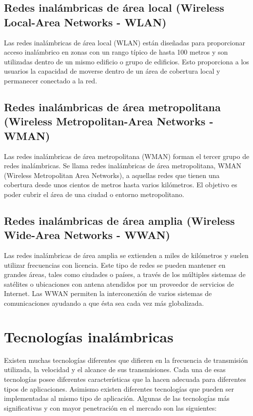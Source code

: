 	\subsection{Redes inalámbricas de área local (Wireless Local-Area Networks - WLAN)}
	Las redes inalámbricas de área local (WLAN) están diseñadas para proporcionar acceso inalámbrico en zonas con un rango típico de hasta 100 metros y son utilizadas dentro de un mismo edificio o grupo de edificios. Esto proporciona a los usuarios la capacidad de moverse dentro de un área de cobertura local y permanecer conectado a la red. 
	
	\subsection{Redes inalámbricas de área metropolitana (Wireless Metropolitan-Area Networks - WMAN)}
	Las redes inalámbricas de área metropolitana (WMAN) forman el tercer grupo de redes inalámbricas. Se llama redes inalámbricas de área metropolitana, WMAN (Wireless Metropolitan Area Networks), a aquellas redes que tienen una cobertura desde unos cientos de metros hasta varios kilómetros. El objetivo es poder cubrir el área de una ciudad o entorno metropolitano. 
	
	\subsection{Redes inalámbricas de área amplia (Wireless Wide-Area Networks - WWAN)}
	Las redes inalámbricas de área amplia se extienden a miles de kilómetros y suelen utilizar frecuencias con licencia. Este tipo de redes se pueden mantener en grandes áreas, tales como ciudades o países, a través de los múltiples sistemas de satélites o ubicaciones con antena atendidos por un proveedor de servicios de Internet. Las WWAN permiten la interconexión de varios sistemas de comunicaciones ayudando a que ésta sea cada vez más globalizada.

	\section{Tecnologías inalámbricas}
	Existen muchas tecnologías diferentes que difieren en la frecuencia de transmisión utilizada, la velocidad y el alcance de sus transmisiones. Cada una de esas tecnologías posee diferentes características que la hacen adecuada para diferentes tipos de aplicaciones. Asimismo existen diferentes tecnologías que pueden ser implementadas al mismo tipo de aplicación. Algunas de las tecnologías más significativas y con mayor penetración en el mercado son las siguientes:
	

